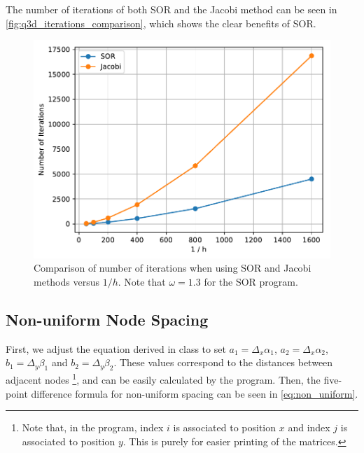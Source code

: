 \documentclass[a4paper,titlepage]{article}
\begin{document}
	The number of iterations of both SOR and the Jacobi method can be seen in \autoref{fig:q3d_iterations_comparison}, which shows the clear benefits of SOR.

	\begin{figure}[!htb]
		\centering
		\includegraphics[width=\columnwidth]{plots/q3d_iterations_comparison.pdf}
		\caption
		{Comparison of number of iterations when using SOR and Jacobi methods versus $1/h$. Note that $\omega=1.3$ for the SOR program.}
		\label{fig:q3d_iterations_comparison}
	\end{figure}
	
	\subsection{Non-uniform Node Spacing}
	
	First, we adjust the equation derived in class to set $a_1 = \Delta_x\alpha_1$, $a_2 = \Delta_x\alpha_2$, $b_1 = \Delta_y\beta_1$ and $b_2 = \Delta_y\beta_2$. These values correspond to the distances between adjacent nodes \footnote{Note that, in the program, index $i$ is associated to position $x$ and index $j$ is associated to position $y$. This is purely for easier printing of the matrices.}, and can be easily calculated by the program. Then, the five-point difference formula for non-uniform spacing can be seen in \autoref{eq:non_uniform}.
	
\end{document}
